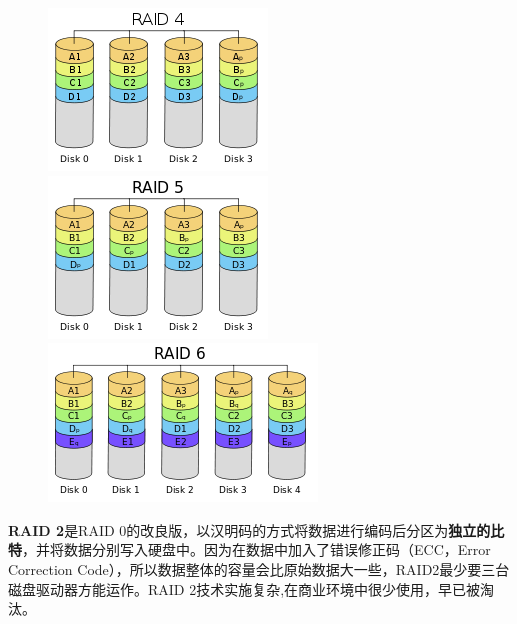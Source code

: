 \begin{figure}[ht]
	\begin{center}
		\includegraphics[keepaspectratio,width=0.2\paperwidth]{Pictures/RAID/RAID4.png}
		\includegraphics[keepaspectratio,width=0.2\paperwidth]{Pictures/RAID/RAID5.png}
		\includegraphics[keepaspectratio,width=0.2\paperwidth]{Pictures/RAID/RAID6.png}
	\end{center}
\end{figure}

\textbf{RAID 2}是RAID 0的改良版，以汉明码的方式将数据进行编码后分区为\textbf{独立的比特}，并将数据分别写入硬盘中。因为在数据中加入了错误修正码（ECC，Error Correction Code），所以数据整体的容量会比原始数据大一些，RAID2最少要三台磁盘驱动器方能运作。RAID 2技术实施复杂,在商业环境中很少使用，早已被淘汰。

